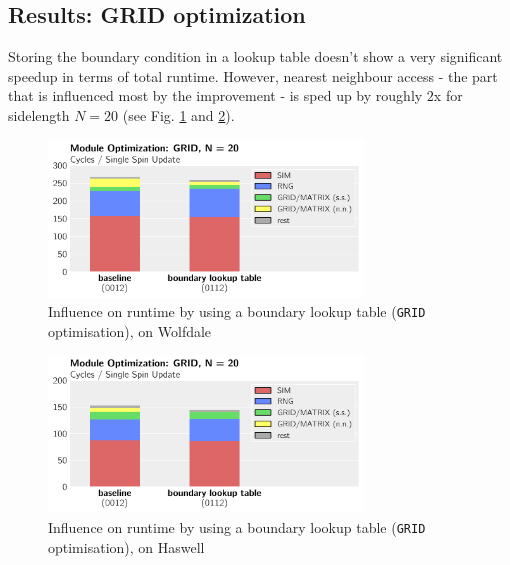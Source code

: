 \documentclass[letterpaper]{article}
\begin{document}
\subsection{Results: GRID optimization}
Storing the boundary condition in a lookup table doesn't show a very significant speedup in terms of total runtime. However, nearest neighbour access - the part that is influenced most by the improvement - is sped up by roughly $2$x for sidelength $N = 20$ (see Fig. \ref{GRID:Wolf:20} and \ref{GRID:Has:20}).
	\begin{figure}[h]\centering
	  \includegraphics[width = 8.36cm]{plots/msk_20_1.pdf}
	  \caption{Influence on runtime by using a boundary lookup table (\texttt{GRID} optimisation), on Wolfdale}
	  \label{GRID:Wolf:20}
	\end{figure}
	\begin{figure}[h]\centering
	  \includegraphics[width = 8.36cm]{plots/dg_20_1.pdf}
	  \caption{Influence on runtime by using a boundary lookup table (\texttt{GRID} optimisation), on Haswell}
	  \label{GRID:Has:20}
	\end{figure}
\end{document}
